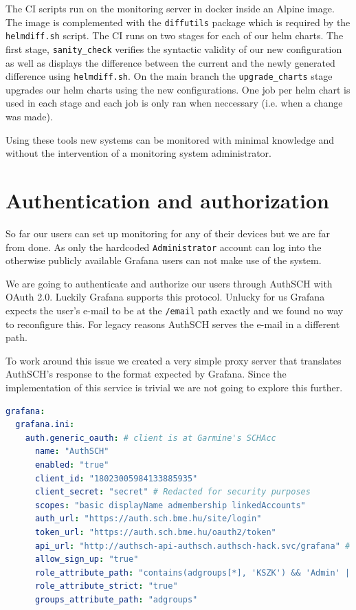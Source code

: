 The CI scripts run on the monitoring server in docker inside an Alpine image.
The image is complemented with the \verb+diffutils+ package which is required
by the \verb+helmdiff.sh+ script. The CI runs on two stages for each of our
helm charts. The first stage, \verb+sanity_check+ verifies the syntactic
validity of our new configuration as well as displays the difference between
the current and the newly generated difference using \verb+helmdiff.sh+. On the
main branch the \verb+upgrade_charts+ stage upgrades our helm charts using the
new configurations. One job per helm chart is used in each stage and each job
is only ran when neccessary (i.e. when a change was made).

Using these tools new systems can be monitored with minimal knowledge and
without the intervention of a monitoring system administrator.

\section{Authentication and authorization}

So far our users can set up monitoring for any of their devices but we are far
from done. As only the hardcoded \verb+Administrator+ account can log into the
otherwise publicly available Grafana users can not make use of the system.

We are going to authenticate and authorize our users through AuthSCH with OAuth
2.0. Luckily Grafana supports this protocol. Unlucky for us Grafana expects the
user's e-mail to be at the \verb+/email+ path exactly and we found no way to
reconfigure this. For legacy reasons AuthSCH serves the e-mail in a different
path.

To work around this issue we created a very simple proxy server that translates
AuthSCH's response to the format expected by Grafana. Since the implementation
of this service is trivial we are not going to explore this further.

\begin{lstlisting}[language=yaml,caption=Grafana OAuth 2.0 configuration]
grafana:
  grafana.ini:
    auth.generic_oauth: # client is at Garmine's SCHAcc
      name: "AuthSCH"
      enabled: "true"
      client_id: "18023005984133885935"
	  client_secret: "secret" # Redacted for security purposes
      scopes: "basic displayName admembership linkedAccounts"
      auth_url: "https://auth.sch.bme.hu/site/login"
      token_url: "https://auth.sch.bme.hu/oauth2/token"
      api_url: "http://authsch-api-authsch.authsch-hack.svc/grafana" # ha-ha
      allow_sign_up: "true"
      role_attribute_path: "contains(adgroups[*], 'KSZK') && 'Admin' || contains(adgroups[*], 'KSZKUjonc') && 'Viewer' || 'Vesztettem'"
      role_attribute_strict: "true"
      groups_attribute_path: "adgroups"
\end{lstlisting}


